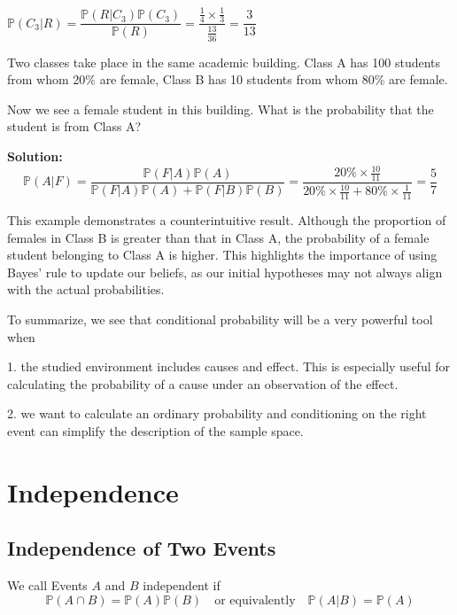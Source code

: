 \(\mathbb{P}(C_3 \vert R) = \dfrac{\mathbb{P}(R \vert C_3)\mathbb{P}(C_3)}{\mathbb{P}(R)} = \dfrac{\frac{1}{4} \times \frac{1}{3}}{\frac{13}{36}} = \dfrac{3}{13}\)

\begin{eg}
    Two classes take place in the same academic building. Class A has 100 students from whom 20\% are female, Class B has 10 students from whom 80\% are female. 

    Now we see a female student in this building. What is the probability that the student is from Class A? 

    \textbf{Solution:} 
    \[
        \mathbb{P}(A \vert F) = \dfrac{\mathbb{P}(F \vert A)\mathbb{P}(A)}{\mathbb{P}(F \vert A)\mathbb{P}(A) + \mathbb{P}(F \vert B)\mathbb{P}(B)} = \dfrac{20\% \times \frac{10}{11}}{20\% \times \frac{10}{11} + 80\% \times \frac{1}{11}} = \dfrac{5}{7}
    \]
\end{eg}

This example demonstrates a counterintuitive result. Although the proportion of females in Class B is greater than that in Class A, the probability of a female student belonging to Class A is higher. This highlights the importance of using Bayes' rule to update our beliefs, as our initial hypotheses may not always align with the actual probabilities.

To summarize, we see that conditional probability will be a very powerful tool when

1. the studied environment includes causes and effect. This is especially useful for calculating the probability of a cause under an observation of the effect. 

2. we want to calculate an ordinary probability and conditioning on the right event can simplify the description of the sample space. 

\section{Independence}
\subsection{Independence of Two Events}
\begin{definition}
    We call Events \(A\) and \(B\) independent if 
    \[
        \mathbb{P}(A \cap B) = \mathbb{P}(A)\mathbb{P}(B)\quad\text{or equivalently}\quad  \mathbb{P}(A \vert B) = \mathbb{P}(A)
    \]
\end{definition}

